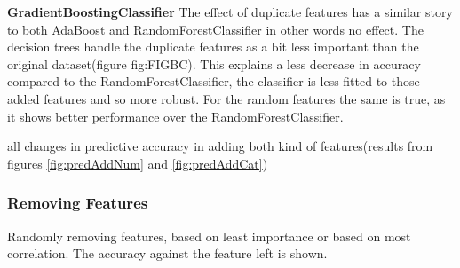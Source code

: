 \documentclass[a4paper,10pt]{article}
\begin{document}
\textbf{GradientBoostingClassifier} The effect of duplicate features has a similar story to both AdaBoost and RandomForestClassifier in other words no effect. The decision trees handle the duplicate features as a bit less important than the original dataset(figure {fig:FIGBC}). This explains a less decrease in accuracy compared to the RandomForestClassifier, the classifier is less fitted to those added features and so more robust. For the random features the same is true, as it shows better performance over the RandomForestClassifier. \\

\begin{table}[h]
	\centering
	\caption{all changes in predictive accuracy in adding both kind of features(results from figures \ref{fig:predAddNum} and \ref{fig:predAddCat})}\label{table:fluc}
\end{table}
\newpage

\subsubsection{Removing Features}
Randomly removing features, based on least importance or based on most correlation. The accuracy against the feature left is shown. 
\end{document}

